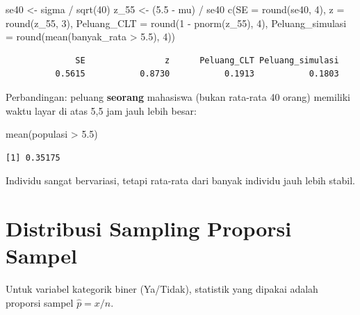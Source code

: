 \documentclass[
  indonesian,
  letterpaper,
]{book}
\newenvironment{Shaded}{\begin{snugshade}}{\end{snugshade}}
\newcommand{\AttributeTok}[1]{\textcolor[rgb]{0.40,0.45,0.13}{#1}}
\newcommand{\DecValTok}[1]{\textcolor[rgb]{0.68,0.00,0.00}{#1}}
\newcommand{\FloatTok}[1]{\textcolor[rgb]{0.68,0.00,0.00}{#1}}
\newcommand{\FunctionTok}[1]{\textcolor[rgb]{0.28,0.35,0.67}{#1}}
\newcommand{\NormalTok}[1]{\textcolor[rgb]{0.00,0.23,0.31}{#1}}
\newcommand{\OtherTok}[1]{\textcolor[rgb]{0.00,0.23,0.31}{#1}}
\newcommand{\SpecialCharTok}[1]{\textcolor[rgb]{0.37,0.37,0.37}{#1}}
\begin{document}
\begin{Shaded}
\begin{Highlighting}[]
\NormalTok{se40 }\OtherTok{\textless{}{-}}\NormalTok{ sigma }\SpecialCharTok{/} \FunctionTok{sqrt}\NormalTok{(}\DecValTok{40}\NormalTok{)}
\NormalTok{z\_55 }\OtherTok{\textless{}{-}}\NormalTok{ (}\FloatTok{5.5} \SpecialCharTok{{-}}\NormalTok{ mu) }\SpecialCharTok{/}\NormalTok{ se40}
\FunctionTok{c}\NormalTok{(}\AttributeTok{SE =} \FunctionTok{round}\NormalTok{(se40, }\DecValTok{4}\NormalTok{), }\AttributeTok{z =} \FunctionTok{round}\NormalTok{(z\_55, }\DecValTok{3}\NormalTok{),}
  \AttributeTok{Peluang\_CLT =} \FunctionTok{round}\NormalTok{(}\DecValTok{1} \SpecialCharTok{{-}} \FunctionTok{pnorm}\NormalTok{(z\_55), }\DecValTok{4}\NormalTok{),}
  \AttributeTok{Peluang\_simulasi =} \FunctionTok{round}\NormalTok{(}\FunctionTok{mean}\NormalTok{(banyak\_rata }\SpecialCharTok{\textgreater{}} \FloatTok{5.5}\NormalTok{), }\DecValTok{4}\NormalTok{))}
\end{Highlighting}
\end{Shaded}

\begin{verbatim}
              SE                z      Peluang_CLT Peluang_simulasi 
          0.5615           0.8730           0.1913           0.1803 
\end{verbatim}

Perbandingan: peluang \textbf{seorang} mahasiswa (bukan rata-rata 40
orang) memiliki waktu layar di atas 5,5 jam jauh lebih besar:

\begin{Shaded}
\begin{Highlighting}[]
\FunctionTok{mean}\NormalTok{(populasi }\SpecialCharTok{\textgreater{}} \FloatTok{5.5}\NormalTok{)}
\end{Highlighting}
\end{Shaded}

\begin{verbatim}
[1] 0.35175
\end{verbatim}

Individu sangat bervariasi, tetapi rata-rata dari banyak individu jauh
lebih stabil.

\section{Distribusi Sampling Proporsi
Sampel}\label{distribusi-sampling-proporsi-sampel}

Untuk variabel kategorik biner (Ya/Tidak), statistik yang dipakai adalah
proporsi sampel \(\hat{p} = x/n\).
\end{document}
